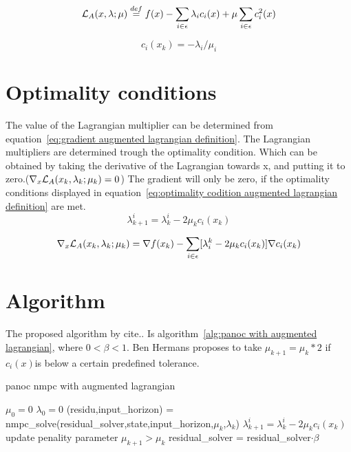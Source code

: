 	\begin{equation}
		\mathcal{L}_A(x,\lambda;\mu) \overset{def}{=} f(x) - \sum_{i \in \epsilon}\lambda_ic_i(x) + \mu \sum_{i \in \epsilon}c_i^2(x)
		\label{eq:augmented lagrangian definition}
	\end{equation}
			
	\begin{equation}
		c_i(x_k) = -\lambda_i/\mu_i
		\label{eq:perturbed feasibility conditions}
	\end{equation}
	

\section{Optimality conditions}
	The value of the Lagrangian multiplier can be determined from equation~\ref{eq:gradient augmented lagrangian definition}. The Lagrangian multipliers are determined trough the optimality condition. Which can be obtained by taking the derivative of the Lagrangian towards x, and putting it to zero.($\nabla_x \mathcal{L}_A(x_k,\lambda_k;\mu_k) = 0$) The gradient will only be zero, if the optimality conditions displayed in equation~\ref{eq:optimality codition augmented lagrangian definition} are met.
	\begin{equation}
		\lambda_{k+1}^{i} = \lambda_{k}^{i} - 2\mu_k c_i(x_k)
		\label{eq:optimality codition augmented lagrangian definition}
	\end{equation}

	\begin{equation}
		\nabla_x \mathcal{L}_A(x_k,\lambda_k;\mu_k) = \nabla f(x_k) - \sum_{i \in \epsilon} [\lambda_i^k - 2\mu_k c_i(x_k)] \nabla c_i(x_k)
		\label{eq:gradient augmented lagrangian definition}
	\end{equation}	
	
	
	
\section{Algorithm}
	The proposed algorithm by cite.. Is algorithm~\ref{alg:panoc with augmented lagrangian}, where $0<\beta<1$. Ben Hermans proposes to take $\mu_{k+1}=\mu_k*2$ if $c_i(x)$is below a certain predefined tolerance. 
	
	\begin{algorithm}
		\caption{panoc nmpc with augmented lagrangian}
		\label{alg:panoc with augmented lagrangian}
		\begin{algorithmic}[1]
			\State $\mu_0=0$
			\State $\lambda_0=0$
			\State (residu,input\_horizon) = nmpc\_solve(residual\_solver,state,input\_horizon,$\mu_k$,$\lambda_k$)
			\State $\lambda_{k+1}^{i} = \lambda_{k}^{i} - 2\mu_k c_i(x_k)$
			\State update penality parameter $\mu_{k+1}>\mu_k$
			\State residual\_solver =  residual\_solver$\cdot \beta$
			\EndWhile
			\EndProcedure
		\end{algorithmic}
	\end{algorithm}


	
		
		